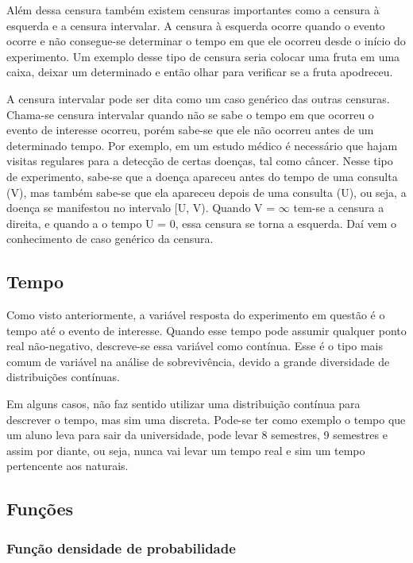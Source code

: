 \documentclass[12pt,a4paper]{article}
\begin{document}
Além dessa censura também existem censuras importantes como a censura à esquerda e a censura intervalar. A censura à esquerda ocorre quando o evento ocorre e não consegue-se determinar o tempo em que ele ocorreu desde o início do experimento. Um exemplo desse tipo de censura seria colocar uma fruta em uma caixa, deixar um determinado e então olhar para verificar se a fruta apodreceu.

A censura intervalar pode ser dita como um caso genérico das outras censuras. Chama-se censura intervalar quando não se sabe o tempo em que ocorreu o evento de interesse
ocorreu, porém sabe-se que ele não ocorreu antes de um determinado tempo. Por exemplo, em um estudo médico é necessário que hajam visitas regulares para a detecção de certas doenças, tal como câncer. Nesse tipo de experimento, sabe-se que a doença apareceu antes do tempo de uma consulta (V), mas também sabe-se que ela apareceu depois de uma consulta (U), ou seja, a doença se manifestou no intervalo [U, V). Quando V = $\infty$
tem-se a censura a direita, e quando a o tempo U = 0, essa censura se torna a esquerda. Daí vem o conhecimento de caso genérico da censura.

\subsection{Tempo}

Como visto anteriormente, a variável resposta do experimento em questão é o tempo até o evento de interesse. Quando esse tempo pode assumir qualquer ponto real não-negativo, descreve-se essa variável como contínua. Esse é o tipo mais comum de variável na análise de sobrevivência, devido a grande diversidade de distribuições contínuas. %

Em alguns casos, não faz sentido utilizar uma distribuição contínua para descrever o tempo, mas sim uma discreta. Pode-se ter como exemplo o tempo que um aluno leva para sair da universidade, pode levar 8 semestres, 9 semestres e assim por diante, ou seja, nunca vai levar um tempo real e sim um tempo pertencente aos naturais.%

\subsection{Funções}

\subsubsection{Função densidade de probabilidade}
\end{document}
